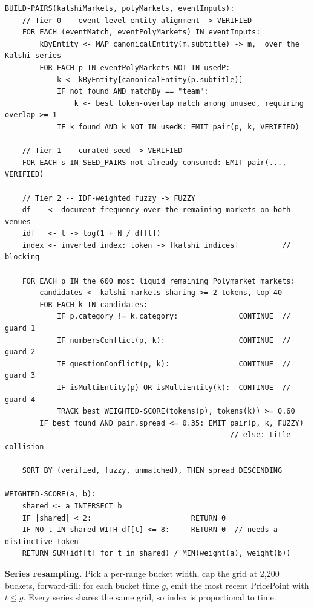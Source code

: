 \documentclass[11pt,a4paper]{article}
\newcommand{\code}[1]{{\ttfamily\small #1}}
\begin{document}
\begin{lstlisting}
BUILD-PAIRS(kalshiMarkets, polyMarkets, eventInputs):
    // Tier 0 -- event-level entity alignment -> VERIFIED
    FOR EACH (eventMatch, eventPolyMarkets) IN eventInputs:
        kByEntity <- MAP canonicalEntity(m.subtitle) -> m,  over the Kalshi series
        FOR EACH p IN eventPolyMarkets NOT IN usedP:
            k <- kByEntity[canonicalEntity(p.subtitle)]
            IF not found AND matchBy == "team":
                k <- best token-overlap match among unused, requiring overlap >= 1
            IF k found AND k NOT IN usedK: EMIT pair(p, k, VERIFIED)

    // Tier 1 -- curated seed -> VERIFIED
    FOR EACH s IN SEED_PAIRS not already consumed: EMIT pair(..., VERIFIED)

    // Tier 2 -- IDF-weighted fuzzy -> FUZZY
    df    <- document frequency over the remaining markets on both venues
    idf   <- t -> log(1 + N / df[t])
    index <- inverted index: token -> [kalshi indices]          // blocking

    FOR EACH p IN the 600 most liquid remaining Polymarket markets:
        candidates <- kalshi markets sharing >= 2 tokens, top 40
        FOR EACH k IN candidates:
            IF p.category != k.category:              CONTINUE  // guard 1
            IF numbersConflict(p, k):                 CONTINUE  // guard 2
            IF questionConflict(p, k):                CONTINUE  // guard 3
            IF isMultiEntity(p) OR isMultiEntity(k):  CONTINUE  // guard 4
            TRACK best WEIGHTED-SCORE(tokens(p), tokens(k)) >= 0.60
        IF best found AND pair.spread <= 0.35: EMIT pair(p, k, FUZZY)
                                                    // else: title collision

    SORT BY (verified, fuzzy, unmatched), THEN spread DESCENDING

WEIGHTED-SCORE(a, b):
    shared <- a INTERSECT b
    IF |shared| < 2:                       RETURN 0
    IF NO t IN shared WITH df[t] <= 8:     RETURN 0  // needs a distinctive token
    RETURN SUM(idf[t] for t in shared) / MIN(weight(a), weight(b))
\end{lstlisting}

\textbf{Series resampling.} Pick a per-range bucket width, cap the grid at 2{,}200 buckets,
forward-fill: for each bucket time $g$, emit the most recent \code{PricePoint} with
$t \leq g$. Every series shares the same grid, so index is proportional to time.

\end{document}
